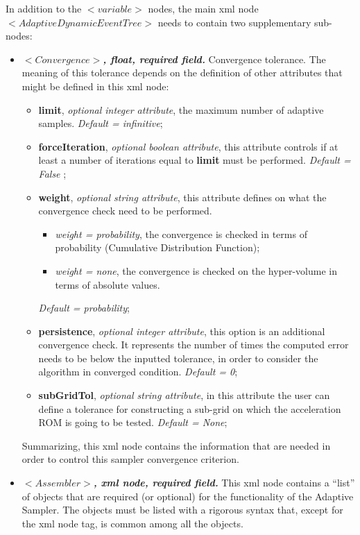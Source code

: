  In addition to the $<variable>$ nodes,  the main xml node $<AdaptiveDynamicEventTree>$ needs to contain two supplementary sub-nodes:
\begin{itemize}
  \item $<Convergence>$\textbf{\textit{, float, required field.}} Convergence tolerance. The meaning of this tolerance depends on the definition of other attributes that might be defined in this xml node:
     \begin{itemize}
         \item \textbf{limit}, \textit{optional integer attribute}, the maximum number of adaptive samples. \textit{Default = infinitive};
         \item \textbf{forceIteration}, \textit{optional boolean attribute}, this attribute controls if at least a number of iterations equal to \textbf{limit} must be performed.  \textit{Default = False} ;
         \item \textbf{weight}, \textit{optional string attribute}, this attribute defines on what the convergence check need to be performed.
          \begin{itemize}
             \item \textit{weight = probability}, the convergence is checked in terms of probability (Cumulative Distribution Function);
             \item \textit{weight = none}, the convergence is checked on the hyper-volume in terms of absolute values.
          \end{itemize} 
          \textit{Default = probability};
         \item \textbf{persistence}, \textit{optional integer attribute}, this option is an additional convergence check. It represents the number of times the computed error needs to be below the inputted tolerance, in order to consider the algorithm in converged condition.  \textit{Default = 0};
         \item \textbf{subGridTol}, \textit{optional string attribute}, in this attribute the user can define a tolerance for constructing a sub-grid on which the acceleration ROM is going to be tested. \textit{Default = None};
      \end{itemize}   
   Summarizing,  this xml node contains the information that are needed in order to control this sampler convergence criterion.
   \item $<Assembler>$\textbf{\textit{, xml node, required field.}} This xml node contains a ``list'' of objects that are required (or optional) for the functionality of the Adaptive Sampler. The objects must be listed with a rigorous syntax that, except for the xml node tag, is common among all the objects.  

\end{itemize}
